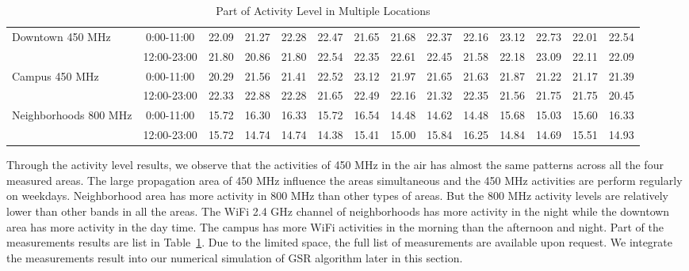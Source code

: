 \begin{table}
\begin{tabular}{|l|c|c|c|c|c|c|c|c|c|c|c|c|c|}
\multirow{2}{*}{Downtown 450 MHz}	
&0:00-11:00 &  22.09 &  21.27 &  22.28 &  22.47 &  21.65 &  21.68&  22.37 &  22.16&  23.12 &  22.73&  22.01 &  22.54 \\ 	
\cline{2-14}	
&12:00-23:00&  21.80 &  20.86 &  21.80 &  22.54 &  22.35 &  22.61&  22.45 &  21.58&  22.18 &  23.09&  22.11 &  22.09 \\ 	
\cline{1-14}	
\multirow{2}{*}{Campus 450 MHz}	
&0:00-11:00 &  20.29 &  21.56 &  21.41 &  22.52 &  23.12 &  21.97&  21.65 &  21.63&  21.87 &  21.22&  21.17 &  21.39 \\ 	
\cline{2-14}	
&12:00-23:00&  22.33 &  22.88 &  22.28 &  21.65 &  22.49 &  22.16&  21.32 &  22.35&  21.56 &  21.75&  21.75 &  20.45 \\ 	
\cline{1-14}	
\multirow{2}{*}{Neighborhoods 800 MHz}	
&0:00-11:00 &  15.72 &  16.30 &  16.33 &  15.72 &  16.54 &  14.48&  14.62 &  14.48&  15.68 &  15.03&  15.60 &  16.33 \\ 	
\cline{2-14}	
&12:00-23:00&  15.72 &  14.74 &  14.74 &  14.38 &  15.41 &  15.00&  15.84 &  16.25&  14.84 &  14.69&  15.51 &  14.93 \\ 	
\hline	
\end{tabular}    
\caption{Part of Activity Level in Multiple Locations} %
\label{tab:activitymeasurement}    
\vspace{-0.3in}
\end{table}    


Through the activity level results, we observe that the activities of 450 MHz in the air has almost the same patterns across all 
the four measured areas. The large propagation area of 450 MHz influence the areas simultaneous and the 450 MHz activities are 
perform regularly on weekdays.
Neighborhood area has more activity in 800 MHz than other types of areas. But the 800 MHz activity levels are relatively lower than 
other bands in all the areas.
The WiFi 2.4 GHz channel of neighborhoods has more activity in the night while the downtown area has more activity in the day time.
The campus has more WiFi activities in the morning than the afternoon and night. 
Part of the measurements results are list in Table~\ref{tab:activitymeasurement}.
Due to the limited space, the full list of measurements are available upon request.
We integrate the measurements result into our numerical simulation of GSR algorithm later in this section.




